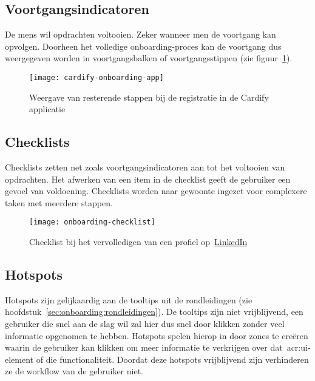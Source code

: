 \subsection{Voortgangsindicatoren}
\label{sec:onboarding:voortgang}

De mens wil opdrachten voltooien. Zeker wanneer men de voortgang kan opvolgen. Doorheen het volledige onboarding-proces kan de voortgang dus weergegeven worden in voortgangsbalken of voortgangsstippen (zie figuur~\ref{fig:onboarding:voortgang}).

\begin{figure}[h!]
    \centering
    \texttt{[image: cardify-onboarding-app]}
    \caption[Voorbeeld voortgangsindicatoren]{Weergave van resterende stappen bij de registratie in de Cardify applicatie}
    \label{fig:onboarding:voortgang}
\end{figure}

\subsection{Checklists}
\label{sec:onboarding:checklists}

Checklists zetten net zoals voortgangsindicatoren aan tot het voltooien van opdrachten. Het afwerken van een item in de checklist geeft de gebruiker een gevoel van voldoening. Checklists worden naar gewoonte ingezet voor complexere taken met meerdere stappen.

\begin{figure}[h!]
    \centering
    \texttt{[image: onboarding-checklist]}
    \caption[Voorbeeld checklist]{Checklist bij het vervolledigen van een profiel op~\href{https://www.linkedin.com/}{LinkedIn}}
    \label{fig:onboarding:checklist}
\end{figure}

\subsection{Hotspots}
\label{sec:onboarding:hotspots}

Hotspots zijn gelijkaardig aan de tooltips uit de rondleidingen (zie hoofdstuk~\ref{sec:onboarding:rondleidingen}). De tooltips zijn niet vrijblijvend, een gebruiker die snel aan de slag wil zal hier dus snel door klikken zonder veel informatie opgenomen te hebben. Hotspots spelen hierop in door zones te creëren waarin de gebruiker kan klikken om meer informatie te verkrijgen over dat~\acrshort{acr:ui}-element of die functionaliteit. Doordat deze hotspots vrijblijvend zijn verhinderen ze de workflow van de gebruiker niet.

